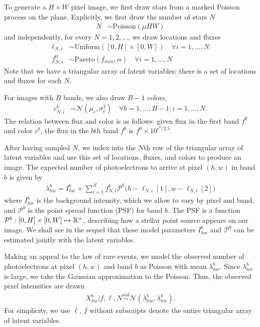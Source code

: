 To generate a $H \times W$ pixel image, we first draw stars from a marked Poisson process
on the plane. Explicitly, we first draw the number of stars $N$
\begin{align}
	N &\sim \text{Poisson}(\mu HW)
\end{align}
and independently, for every $N = 1, 2, ... $, we draw locations and fluxes
\begin{align}
  \ell_{N, i} &\sim \text{Uniform}([0, H] \times [0, W]) \quad \forall i = 1, ..., N \\
  f_{N, i}^{0} & \sim \text{Pareto}(f_{min}, \alpha) \quad \forall i = 1, ..., N
  \label{eq:flux_prior}
\end{align}
Note that we have a triangular array of latent variables; there is a set of
locations and fluxes for each $N$.

For images with $B$ bands, we also draw $B - 1$ colors,
\begin{align}
  c_{N, i}^{b}  & \sim \mathcal{N}(\mu_c, \sigma^2_c) \quad \forall b = 1, ..., B - 1; i = 1, ..., N.
\end{align}
The relation between flux and color is as follows: 
given flux in the first band $f^0$ and color $c^b$, 
the flux in the $b$th band $f^b$ is $f^0 \times 10^{c^b / 2.5}$.

After having sampled $N$,
we index into the $N$th row of the triangular array of latent variables
and use this set of locations, fluxes, and colors to produce an image.
The expected number of photoelectrons to arrive at pixel $(h,w)$ in band $b$ is given by
\begin{align}
  \lambda^b_{hw} = I^{b}_{hw} + \sum_{i = 1}^N f_{N, i}^b \mathcal{P}^b\big(h - \ell_{N, i}[1], w - \ell_{N,i}[2]\big)
  \label{eq:expected_intensity}
\end{align}
where $I^{b}_{hw}$ is the background intensity, which we allow to vary by pixel and band,
and $\mathcal{P}^b$ is the point spread function (PSF) for band $b$. The PSF
is a function $\mathcal{P}^b : [0, H] \times [0, W] \mapsto \mathbb{R}^+$,
describing how a stellar point source appears
on our image. We shall see in the sequel that these model
parameters $I^{b}_{hw}$ and $\mathcal{P}^b$ can be estimated jointly with
the latent variables.

Making an appeal to the law of rare events, we model the
observed number of photoelectrons at pixel $(h,w)$ and band $b$ as Poisson
with mean $\lambda^b_{hw}$. Since $\lambda^b_{hw}$ is large,
we take the Gaussian approximation to the Poisson.
Thus, the observed pixel intensities are drawn
\begin{align}
  X_{hw}^b | f, \ell, N \overset{ind}{\sim} \mathcal{N}(\lambda^b_{hw}, \lambda^b_{hw}).
\end{align}
For simplicity, we use $\ell$, $f$ without subscripts  
denote the entire triangular array of latent variables. 

